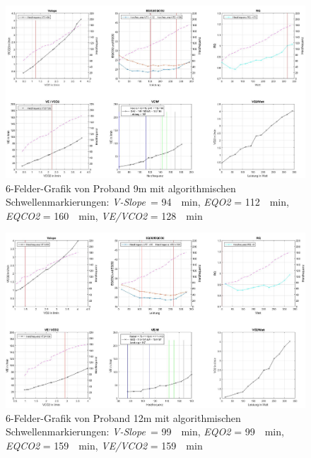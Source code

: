 %
\begin{figure}[H]
	\centering
	\noindent\includegraphics[angle=0,width=\linewidth,keepaspectratio]{Bilder/auto_9}
	\caption[6-Felder-Grafik von Proband 9m mit algorithmischen Schwellenmarkierungen]{6-Felder-Grafik von Proband 9m mit algorithmischen Schwellenmarkierungen: \textsl{V-Slope}~= \SI{94}{\per\minute}, \textsl{\gls{EQO2}} = \SI{112}{\per\minute}, \textsl{\gls{EQCO2}} = \SI{160}{\per\minute}, \textsl{\gls{VE}/\gls{VCO2}} = \SI{128}{\per\minute}}
	\label{pic:pic19}
\end{figure}
%
\begin{figure}[H]
	\centering
	\noindent\includegraphics[angle=0,width=\linewidth,keepaspectratio]{Bilder/auto_12}
	\caption[6-Felder-Grafik von Proband 12m mit algorithmischen Schwellenmarkierungen]{6-Felder-Grafik von Proband 12m mit algorithmischen Schwellenmarkierungen: \textsl{V-Slope}~= \SI{99}{\per\minute}, \textsl{\gls{EQO2}} = \SI{99}{\per\minute}, \textsl{\gls{EQCO2}} = \SI{159}{\per\minute}, \textsl{\gls{VE}/\gls{VCO2}} = \SI{159}{\per\minute}}
	\label{pic:pic20}
\end{figure}
